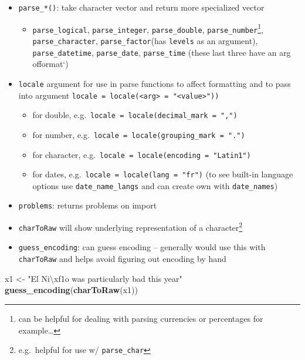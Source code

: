 \documentclass[]{book}
\newenvironment{Shaded}{\begin{snugshade}}{\end{snugshade}}
\newcommand{\CharTok}[1]{\textcolor[rgb]{0.31,0.60,0.02}{#1}}
\newcommand{\KeywordTok}[1]{\textcolor[rgb]{0.13,0.29,0.53}{\textbf{#1}}}
\newcommand{\NormalTok}[1]{#1}
\newcommand{\StringTok}[1]{\textcolor[rgb]{0.31,0.60,0.02}{#1}}
\providecommand{\tightlist}{%
  \setlength{\itemsep}{0pt}\setlength{\parskip}{0pt}}
\let\rmarkdownfootnote\footnote%
\def\footnote{\protect\rmarkdownfootnote}
\theoremstyle{definition}
\theoremstyle{definition}
\theoremstyle{definition}
\theoremstyle{remark}
\begin{document}
\begin{itemize}
\tightlist
\item
  \texttt{parse\_*()}: take character vector and return more specialized
  vector

  \begin{itemize}
  \tightlist
  \item
    \texttt{parse\_logical}, \texttt{parse\_integer},
    \texttt{parse\_double}, \texttt{parse\_number}\footnote{can be
      helpful for dealing with parsing currencies or percentages for
      example\ldots{}}, \texttt{parse\_character},
    \texttt{parse\_factor}(has \texttt{levels} as an argument),
    \texttt{parse\_datetime}, \texttt{parse\_date}, \texttt{parse\_time}
    (these last three have an arg of\texttt{}format`)
  \end{itemize}
\item
  \texttt{locale} argument for use in parse functions to affect
  formatting and to pass into argument
  \texttt{locale\ =\ locale(\textless{}arg\textgreater{}\ =\ "\textless{}value\textgreater{}"))}

  \begin{itemize}
  \tightlist
  \item
    for double, e.g.~\texttt{locale\ =\ locale(decimal\_mark\ =\ ",")}
  \item
    for number, e.g.~\texttt{locale\ =\ locale(grouping\_mark\ =\ ".")}
  \item
    for character,
    e.g.~\texttt{locale\ =\ locale(encoding\ =\ "Latin1")}
  \item
    for dates, e.g.~\texttt{locale\ =\ locale(lang\ =\ "fr")} (to see
    built-in language options use \texttt{date\_name\_langs} and can
    create own with \texttt{date\_names})
  \end{itemize}
\item
  \texttt{problems}: returns problems on import
\item
  \texttt{charToRaw} will show underlying representation of a
  character\footnote{e.g.~helpful for use w/ \texttt{parse\_char}}
\item
  \texttt{guess\_encoding}: can guess encoding -- generally would use
  this with \texttt{charToRaw} and helps avoid figuring out encoding by
  hand
\end{itemize}

\begin{Shaded}
\begin{Highlighting}[]
\NormalTok{x1 <-}\StringTok{ "El Ni}\CharTok{\textbackslash{}xf1}\StringTok{o was particularly bad this year"}
\KeywordTok{guess_encoding}\NormalTok{(}\KeywordTok{charToRaw}\NormalTok{(x1))}
\end{Highlighting}
\end{Shaded}
\end{document}
